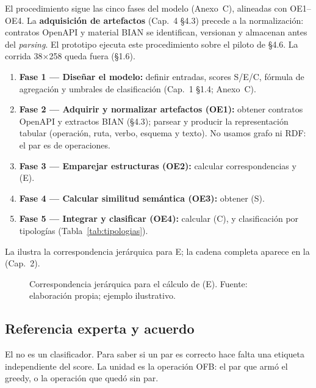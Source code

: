 El procedimiento sigue las cinco fases del modelo (Anexo~C), alineadas con OE1--OE4. La
\textbf{adquisición de artefactos} (Cap.~4 §4.3) precede a la normalización: contratos OpenAPI y
material BIAN se identifican, versionan y almacenan antes del \textit{parsing}. El prototipo
ejecuta este procedimiento sobre el piloto de §4.6. La corrida 38$\times$258 queda fuera (§1.6).

\begin{enumerate}
  \item \textbf{Fase 1 --- Diseñar el modelo:} definir entradas, scores S/E/C, fórmula de
        agregación y umbrales de clasificación (Cap.~1 §1.4; Anexo~C).
  \item \textbf{Fase 2 --- Adquirir y normalizar artefactos (OE1):} obtener contratos OpenAPI y
        extractos BIAN (§4.3); parsear y producir la representación tabular (operación, ruta, verbo,
        esquema y texto). No usamos grafo ni RDF: el par es de operaciones.
  \item \textbf{Fase 3 --- Emparejar estructuras (OE2):} calcular correspondencias y
        \StructuralScore{} (E).
  \item \textbf{Fase 4 --- Calcular similitud semántica (OE3):} obtener \SemanticScore{} (S).
  \item \textbf{Fase 5 --- Integrar y clasificar (OE4):} calcular \CoverageScore{} (C),
        \AlignmentScore{} y clasificación por tipologías (Tabla~\ref{tab:tipologias}).
\end{enumerate}



La  ilustra la correspondencia jerárquica para E; la cadena completa
aparece en la  (Cap.~2).

\setcounter{figure}{6}
\begin{figure}[H]
  \centering
  \figCapSeven
  \caption{Correspondencia jerárquica para el cálculo de \StructuralScore{} (E). Fuente: elaboración
  propia; ejemplo ilustrativo.}
  \label{fig:proc-estructural}
\end{figure}

\subsection{Referencia experta y acuerdo}

El \AlignmentScore{} no es un clasificador. Para saber si un par es correcto hace falta una
etiqueta independiente del score. La unidad es la operación OFB: el par que armó el greedy, o
la operación que quedó sin par.

